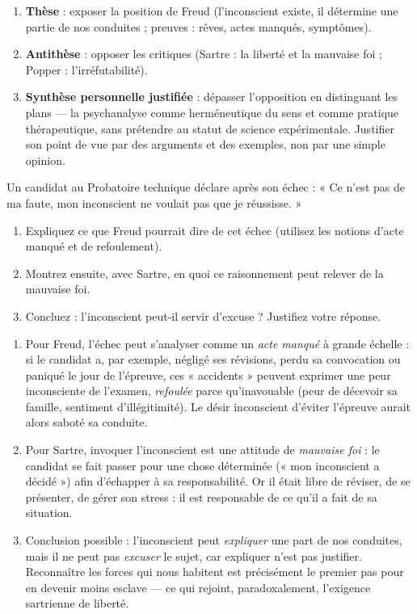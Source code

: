 \documentclass[11pt]{article}
\begin{document}
\begin{methode}
\begin{enumerate}
\item \textbf{Thèse} : exposer la position de Freud (l'inconscient existe, il détermine une partie de nos conduites ; preuves : rêves, actes manqués, symptômes).
\item \textbf{Antithèse} : opposer les critiques (Sartre : la liberté et la mauvaise foi ; Popper : l'irréfutabilité).
\item \textbf{Synthèse personnelle justifiée} : dépasser l'opposition en distinguant les plans — la psychanalyse comme herméneutique du sens et comme pratique thérapeutique, sans prétendre au statut de science expérimentale. Justifier son point de vue par des arguments et des exemples, non par une simple opinion.
\end{enumerate}
\end{methode}

\begin{exercice}
Un candidat au Probatoire technique déclare après son échec : « Ce n'est pas de ma faute, mon inconscient ne voulait pas que je réussisse. »
\begin{enumerate}
\item Expliquez ce que Freud pourrait dire de cet échec (utilisez les notions d'acte manqué et de refoulement).
\item Montrez ensuite, avec Sartre, en quoi ce raisonnement peut relever de la mauvaise foi.
\item Concluez : l'inconscient peut-il servir d'excuse ? Justifiez votre réponse.
\end{enumerate}
\end{exercice}

\begin{corrige}
\begin{enumerate}
\item Pour Freud, l'échec peut s'analyser comme un \emph{acte manqué} à grande échelle : si le candidat a, par exemple, négligé ses révisions, perdu sa convocation ou paniqué le jour de l'épreuve, ces « accidents » peuvent exprimer une peur inconsciente de l'examen, \emph{refoulée} parce qu'inavouable (peur de décevoir sa famille, sentiment d'illégitimité). Le désir inconscient d'éviter l'épreuve aurait alors saboté sa conduite.
\item Pour Sartre, invoquer l'inconscient est une attitude de \emph{mauvaise foi} : le candidat se fait passer pour une chose déterminée (« mon inconscient a décidé ») afin d'échapper à sa responsabilité. Or il était libre de réviser, de se présenter, de gérer son stress : il est responsable de ce qu'il a fait de sa situation.
\item Conclusion possible : l'inconscient peut \emph{expliquer} une part de nos conduites, mais il ne peut pas \emph{excuser} le sujet, car expliquer n'est pas justifier. Reconnaître les forces qui nous habitent est précisément le premier pas pour en devenir moins esclave — ce qui rejoint, paradoxalement, l'exigence sartrienne de liberté.
\end{enumerate}
\end{corrige}
\end{document}
